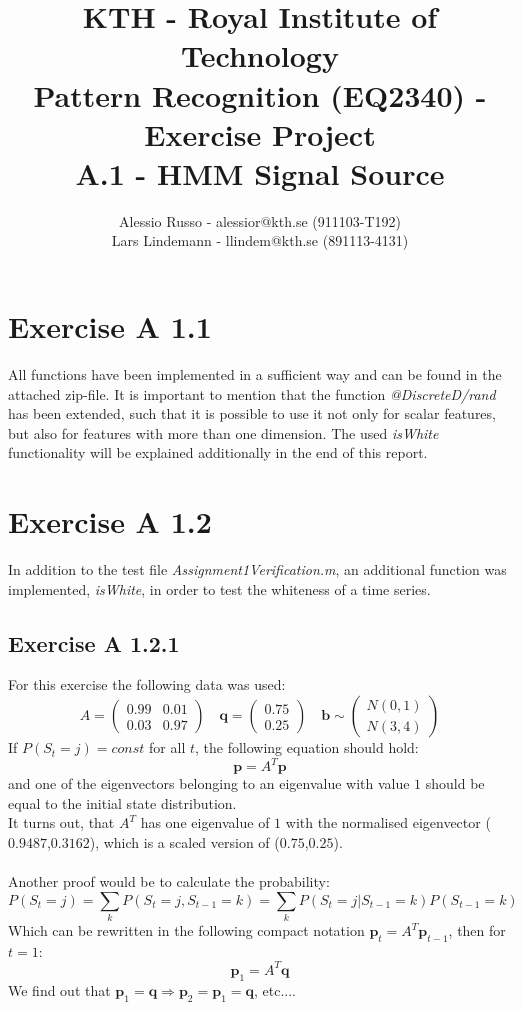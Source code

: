 \documentclass[10pt,a4paper,final]{article}
\author{Alessio Russo - alessior@kth.se (911103-T192) \\ Lars Lindemann - llindem@kth.se (891113-4131)}
\title{KTH - Royal Institute of Technology \\ \Large{Pattern Recognition (EQ2340) - Exercise Project }\\ A.1 - HMM Signal Source}
\begin{document}
\maketitle
\tableofcontents

\section{Exercise A 1.1}
All functions have been implemented in a sufficient way and can be found in the attached zip-file. It is important to mention that the function \textit{@DiscreteD/rand} has been extended, such that it is possible to use it not only for scalar features, but also for features with more than one dimension. The used \textit{isWhite} functionality will be explained additionally in the end of this report.
\newpage
\section{Exercise A 1.2}
In addition to the test file \textit{Assignment1Verification.m}, an additional function was implemented, \textit{isWhite}, in order to test the whiteness of a time series.
\subsection{Exercise A 1.2.1}
For this exercise the following data was used:
$$
A = 
 \begin{pmatrix}
  0.99 & 0.01 \\
  0.03 & 0.97
 \end{pmatrix} \quad
 \mathbf{q} = 
 \begin{pmatrix}
  0.75\\
  0.25
 \end{pmatrix} 
 \quad
 \mathbf{b} \sim
 \begin{pmatrix}
  \mathit{N}(0,1) \\
  \mathit{N}(3,4)
 \end{pmatrix} 
 $$
If $P(S_t=j)=const$ for all $t$, the following equation should hold:
$$\mathbf{p}=A^T \mathbf{p}$$
and one of the eigenvectors belonging to an eigenvalue with value $1$ should be equal to the initial state distribution. 
\\It turns out, that $A^T$ has one eigenvalue of $1$ with the normalised eigenvector ($0.9487$,$0.3162$), which is a scaled version of ($0.75$,$0.25$).
\\ \\
Another proof would be to calculate the probability:
$$P(S_t=j)=\sum_k P(S_t=j,S_{t-1}=k)=\sum_k P(S_t=j|S_{t-1}=k)P(S_{t-1}=k)$$
Which can be rewritten in the following compact notation $\mathbf{p}_t = A^T \mathbf{p}_{t-1}$, then for $t=1$:
$$\mathbf{p}_{1} = A^T \mathbf{q}$$
We find out that $\mathbf{p}_{1}= \mathbf{q} \Rightarrow \mathbf{p}_{2}=\mathbf{p}_{1}= \mathbf{q}$, etc....
\end{document}
